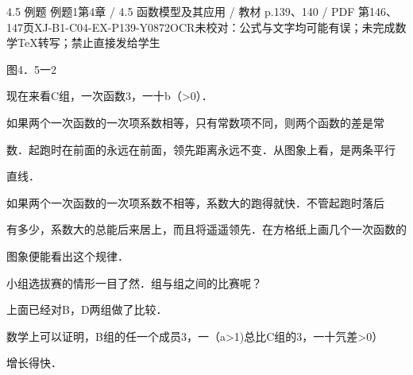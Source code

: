 \begin{bankitem}{4.5 例题 例题1}{第4章 / 4.5 函数模型及其应用 / 教材 p.139、140 / PDF 第146、147页}{XJ-B1-C04-EX-P139-Y0872}{OCR未校对：公式与文字均可能有误；未完成数学TeX转写；禁止直接发给学生}
\begin{ocrdraft}
图4．5一2
\par
现在来看C组，一次函数3，一十b（>0）．
\par
如果两个一次函数的一次项系数相等，只有常数项不同，则两个函数的差是常
\par
数．起跑时在前面的永远在前面，领先距离永远不变．从图象上看，是两条平行
\par
直线．
\par
如果两个一次函数的一次项系数不相等，系数大的跑得就快．不管起跑时落后
\par
有多少，系数大的总能后来居上，而且将遥遥领先．在方格纸上画几个一次函数的
\par
图象便能看出这个规律．
\par
小组选拔赛的情形一目了然．组与组之间的比赛呢？
\par
上面已经对B，D两组做了比较．
\par
数学上可以证明，B组的任一个成员3，一（a>1)总比C组的3，一十氕差>0）
\par
增长得快．
\end{ocrdraft}
\end{bankitem}
